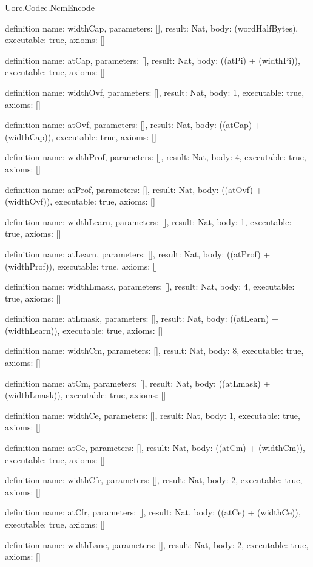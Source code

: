 \begin{lexlean}{Uorc.Codec.NcmEncode}
\begin{semanticmodule}
definition{
  name: widthCap,
  parameters: [],
  result: Nat,
  body: (wordHalfBytes),
  executable: true,
  axioms: []
}

definition{
  name: atCap,
  parameters: [],
  result: Nat,
  body: ((atPi) + (widthPi)),
  executable: true,
  axioms: []
}

definition{
  name: widthOvf,
  parameters: [],
  result: Nat,
  body: 1,
  executable: true,
  axioms: []
}

definition{
  name: atOvf,
  parameters: [],
  result: Nat,
  body: ((atCap) + (widthCap)),
  executable: true,
  axioms: []
}

definition{
  name: widthProf,
  parameters: [],
  result: Nat,
  body: 4,
  executable: true,
  axioms: []
}

definition{
  name: atProf,
  parameters: [],
  result: Nat,
  body: ((atOvf) + (widthOvf)),
  executable: true,
  axioms: []
}

definition{
  name: widthLearn,
  parameters: [],
  result: Nat,
  body: 1,
  executable: true,
  axioms: []
}

definition{
  name: atLearn,
  parameters: [],
  result: Nat,
  body: ((atProf) + (widthProf)),
  executable: true,
  axioms: []
}

definition{
  name: widthLmask,
  parameters: [],
  result: Nat,
  body: 4,
  executable: true,
  axioms: []
}

definition{
  name: atLmask,
  parameters: [],
  result: Nat,
  body: ((atLearn) + (widthLearn)),
  executable: true,
  axioms: []
}

definition{
  name: widthCm,
  parameters: [],
  result: Nat,
  body: 8,
  executable: true,
  axioms: []
}

definition{
  name: atCm,
  parameters: [],
  result: Nat,
  body: ((atLmask) + (widthLmask)),
  executable: true,
  axioms: []
}

definition{
  name: widthCe,
  parameters: [],
  result: Nat,
  body: 1,
  executable: true,
  axioms: []
}

definition{
  name: atCe,
  parameters: [],
  result: Nat,
  body: ((atCm) + (widthCm)),
  executable: true,
  axioms: []
}

definition{
  name: widthCfr,
  parameters: [],
  result: Nat,
  body: 2,
  executable: true,
  axioms: []
}

definition{
  name: atCfr,
  parameters: [],
  result: Nat,
  body: ((atCe) + (widthCe)),
  executable: true,
  axioms: []
}

definition{
  name: widthLane,
  parameters: [],
  result: Nat,
  body: 2,
  executable: true,
  axioms: []
}


\end{semanticmodule}
\end{lexlean}
